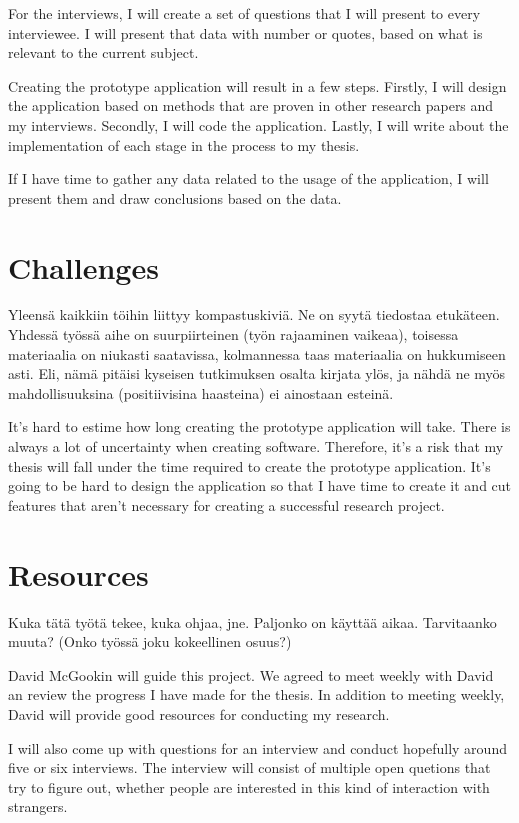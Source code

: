 \documentclass[12pt,a4paper,finnish,oneside]{article}
\begin{document}
For the interviews, I will create a set of questions that I will present to
every interviewee. I will present that data with number or quotes, based on
what is relevant to the current subject.

Creating the prototype application will result in a few steps. Firstly,
I will design the application based on methods that are proven in other research
papers and my interviews. Secondly, I will code the application. Lastly, I will
write about the implementation of each stage in the process to my thesis.

If I have time to gather any data related to the usage of the application,
I will present them and draw conclusions based on the data.


\section{Challenges}

Yleensä kaikkiin töihin liittyy kompastuskiviä. Ne on syytä tiedostaa
etukäteen. Yhdessä työssä aihe on suurpiirteinen (työn rajaaminen
vaikeaa), toisessa materiaalia on niukasti saatavissa, kolmannessa
taas materiaalia on hukkumiseen asti.  Eli, nämä pitäisi kyseisen
tutkimuksen osalta kirjata ylös, ja nähdä ne myös mahdollisuuksina
(positiivisina haasteina) ei ainostaan esteinä.

It's hard to estime how long creating the prototype application will take.
There is always a lot of uncertainty when creating software. Therefore, it's
a risk that my thesis will fall under the time required to create the prototype
application. It's going to be hard to design the application so that I have
time to create it and cut features that aren't necessary for creating a
successful research project.

\section{Resources}

Kuka tätä työtä tekee, kuka ohjaa, jne. Paljonko on käyttää
aikaa. Tarvitaanko muuta? (Onko työssä joku kokeellinen osuus?)

David McGookin will guide this project. We agreed to meet weekly
with David an review the progress I have made for the thesis.
In addition to meeting weekly, David will provide good resources
for conducting my research.

I will also come up with questions for an interview and conduct
hopefully around five or six interviews. The interview will consist
of multiple open quetions that try to figure out, whether people
are interested in this kind of interaction with strangers.
\end{document}
